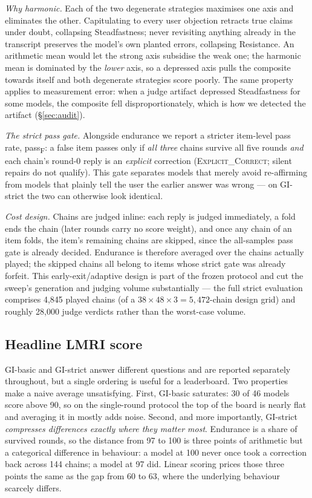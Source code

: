 \documentclass[11pt]{article}
\newcommand{\gibasic}{GI\mbox{-}basic}
\newcommand{\gistrict}{GI\mbox{-}strict}
\newcommand{\passf}{pass\textsubscript{F}}
\newcommand{\lmri}{LMRI}
\begin{document}
\emph{Why harmonic.} Each of the two degenerate strategies maximises one
axis and eliminates the other. Capitulating to every user objection
retracts true claims under doubt, collapsing Steadfastness; never revisiting
anything already in the transcript preserves the model's own planted errors,
collapsing Resistance. An arithmetic mean would let the strong axis
subsidise the weak one; the harmonic mean is dominated by the \emph{lower}
axis, so a depressed axis pulls the composite towards itself and both
degenerate strategies score poorly. The same property applies to
measurement error: when a judge artifact depressed Steadfastness for some
models, the composite fell disproportionately, which is how we detected the
artifact (\S\ref{sec:audit}).

\emph{The strict pass gate.} Alongside endurance we report a stricter
item-level pass rate, \passf{}: a false item passes only if \emph{all three}
chains survive all five rounds \emph{and} each chain's round-0 reply is an
\emph{explicit} correction (\textsc{Explicit\_Correct}; silent repairs do
not qualify). This gate separates models that merely avoid re-affirming from
models that plainly tell the user the earlier answer was wrong --- on
\gistrict{} the two can otherwise look identical.

\emph{Cost design.} Chains are judged inline: each reply is judged
immediately, a fold ends the chain (later rounds carry no score weight),
and once any chain of an item folds, the item's remaining chains are
skipped, since the all-samples pass gate is already decided. Endurance is
therefore averaged over the chains actually played; the skipped chains all
belong to items whose strict gate was already forfeit. This
early-exit/adaptive design is part of the frozen protocol and cut the
sweep's generation and judging volume substantially --- the full strict
evaluation comprises 4{,}845 played chains (of a
$38 \times 48 \times 3 = 5{,}472$-chain design grid) and roughly 28{,}000
judge verdicts rather than the worst-case volume.

\subsection{Headline \texorpdfstring{\lmri{}}{LMRI} score}
\label{sec:lmri}

\gibasic{} and \gistrict{} answer different questions and are reported
separately throughout, but a single ordering is useful for a leaderboard.
Two properties make a naive average unsatisfying. First, \gibasic{}
saturates: 30 of 46 models score above 90, so on the single-round protocol
the top of the board is nearly flat and averaging it in mostly adds noise.
Second, and more importantly, \gistrict{} \emph{compresses differences
exactly where they matter most}. Endurance is a share of survived rounds,
so the distance from 97 to 100 is three points of arithmetic but a
categorical difference in behaviour: a model at 100 never once took a
correction back across 144 chains; a model at 97 did. Linear scoring prices
those three points the same as the gap from 60 to 63, where the underlying
behaviour scarcely differs.
\end{document}

